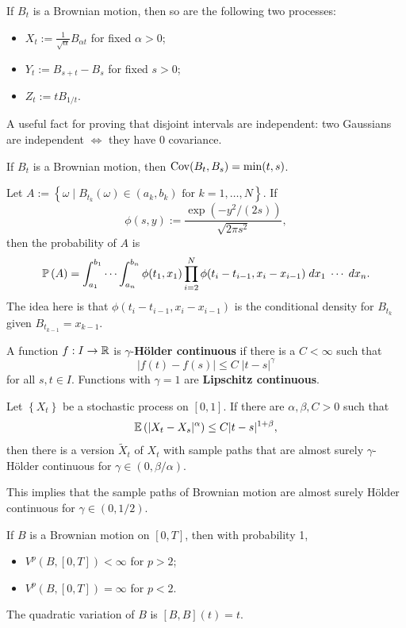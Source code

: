 \documentclass[twoside,10pt]{report}
\begin{document}
\begin{prop}
	If $B_{t}$ is a Brownian motion, then so are the following two processes:
	\begin{itemize}
		\item $X_{t} := \frac{1}{\sqrt{\alpha} } B_{\alpha t}$ for fixed $\alpha > 0$;
		\item $Y_{t} := B_{s+t} - B_{s}$ for fixed $s>0$;
		\item $Z_{t} := t B_{1/t}$.
	\end{itemize}
\end{prop}

A useful fact for proving that disjoint intervals are independent: two Gaussians are independent $\iff$ they have 0 covariance.

\begin{prop}
If $B_{t}$ is a Brownian motion, then $\cov(B_{t},B_{s}) = \min(t,s)$.
\end{prop}


Let $ A := \left\{ \omega \;|\; B_{t_k}(\omega) \in (a_{k},b_{k}) \text{ for } k=1,\dots,N \right\}$. If
\[
\phi(s,y) := \frac{\exp\left( -y^2/(2s) \right)}{\sqrt{2 \pi s^2} } ,
\] then the probability of $A$ is
\[
\P{ A } = \int_{a_1}^{b_1} \cdots \int_{a_n}^{b_n} \phi(t_1, x_1) \prod_{i=2}^{N} \phi(t_{i}-t_{i-1},x_{i}-x_{i-1}) \; dx_1\;\cdots\; dx_{n}.
\] The idea here is that $\phi(t_{i}-t_{i-1},x_{i}-x_{i-1})$ is the conditional density for $B_{t_k}$ given $B_{t_{k-1}}=x_{k-1}$.

\begin{defn}[]
A function $f:I\to \R$ is $\gamma$-\textbf{H\"older continuous} if there is a $C < \infty$ such that
\[
|f(t) - f(s)| \leq C \; |t-s|^{\gamma}
\] for all $s,t \in I$. Functions with $\gamma=1$ are \textbf{Lipschitz continuous}.
\end{defn}

\begin{thrm}
	Let $\left\{ X_{t} \right\}$ be a stochastic process on $[0,1]$. If there are $\alpha,\beta,C>0$ such that
	\[
	\E{ |X_{t}-X_{s}|^{\alpha} } \leq C |t-s|^{1+\beta},
	\] then there is a version $\tilde{X}_{t}$ of $X_{t}$ with sample paths that are almost surely $\gamma$-H\"older continuous for $\gamma \in (0, \beta/\alpha)$.
\end{thrm}


This implies that the sample paths of Brownian motion are almost surely H\"older continuous for $\gamma \in (0,1/2)$.

\begin{prop}
If $B$ is a Brownian motion on $[0,T]$, then with probability 1,
\begin{itemize}
	\item $V^{p}(B,[0,T]) < \infty$ for $p>2$;
	\item $V^{p}(B,[0,T]) = \infty$ for $p<2$.
\end{itemize}
The quadratic variation of $B$ is $[B,B](t) = t$.
\end{prop}
\end{document}
